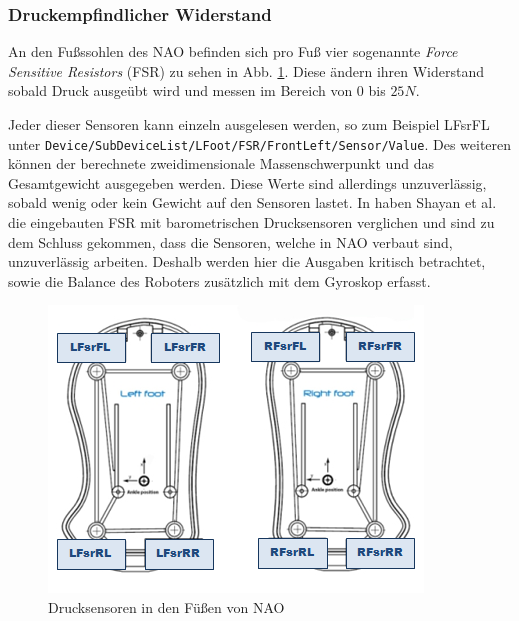 \subsubsection*{Druckempfindlicher Widerstand}

An den Fußssohlen des NAO befinden sich pro Fuß vier sogenannte \textit{Force Sensitive Resistors} (FSR) zu sehen in Abb. \ref{hardware_semelles}. Diese ändern ihren Widerstand sobald Druck ausgeübt wird und messen im Bereich von 0 bis $25 \unit{N}$.

Jeder dieser Sensoren kann einzeln ausgelesen werden, so zum Beispiel LFsrFL unter \texttt{Device/SubDeviceList/LFoot/FSR/FrontLeft/Sensor/Value}. Des weiteren können der berechnete zweidimensionale Massenschwerpunkt und das Gesamtgewicht ausgegeben werden. Diese Werte sind allerdings unzuverlässig, sobald wenig oder kein Gewicht auf den Sensoren lastet. In \cite{pressure_shoe} haben Shayan et al. die eingebauten FSR mit barometrischen Drucksensoren verglichen und sind zu dem Schluss gekommen, dass die Sensoren, welche in NAO verbaut sind, unzuverlässig arbeiten. Deshalb werden hier die Ausgaben kritisch betrachtet, sowie die Balance des Roboters zusätzlich mit dem Gyroskop erfasst.
\begin{figure}[tb]
	\centering
	\includegraphics[width=0.6\linewidth]{Bilder/hardware_semelles.png}
	\caption{Drucksensoren in den Füßen von NAO \cite[ in /Technical overview/FSRs]{nao_docu_dev_guide}
	}
	\label{hardware_semelles}
\end{figure}


